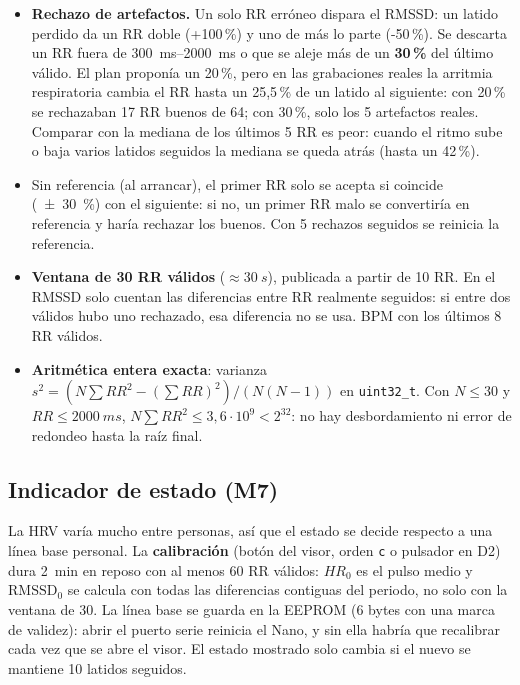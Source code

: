 \documentclass[11pt,a4paper]{article}
\begin{document}
\begin{itemize}[leftmargin=1.2em,itemsep=2pt,topsep=2pt]
  \item \textbf{Rechazo de artefactos.} Un solo RR erróneo dispara el RMSSD: un latido perdido
        da un RR doble (+100\,\%) y uno de más lo parte (-50\,\%). Se descarta un RR fuera de
        \qtyrange{300}{2000}{ms} o que se aleje más de un \textbf{30\,\%} del último válido.
        El plan proponía un 20\,\%, pero en las grabaciones reales la arritmia respiratoria
        cambia el RR hasta un 25,5\,\% de un latido al siguiente: con 20\,\% se rechazaban 17
        RR buenos de 64; con 30\,\%, solo los 5 artefactos reales. Comparar con la mediana de
        los últimos 5 RR es peor: cuando el ritmo sube o baja varios latidos seguidos la
        mediana se queda atrás (hasta un 42\,\%).
  \item Sin referencia (al arrancar), el primer RR solo se acepta si coincide (\qty{\pm 30}{\percent})
        con el siguiente: si no, un primer RR malo se convertiría en referencia y haría
        rechazar los buenos. Con 5 rechazos seguidos se reinicia la referencia.
  \item \textbf{Ventana de 30 RR válidos} ($\approx\qty{30}{s}$), publicada a partir de 10 RR.
        En el RMSSD solo cuentan las diferencias entre RR realmente seguidos: si entre dos
        válidos hubo uno rechazado, esa diferencia no se usa. BPM con los últimos 8 RR
        válidos.
  \item \textbf{Aritmética entera exacta}: varianza
        $s^2 = \left(N\sum RR^2 - (\sum RR)^2\right)/\left(N(N-1)\right)$ en
        \texttt{uint32\_t}. Con $N \le 30$ y $RR \le \qty{2000}{ms}$,
        $N\sum RR^2 \le 3{,}6\cdot 10^9 < 2^{32}$: no hay desbordamiento ni error de redondeo
        hasta la raíz final.
\end{itemize}

\subsection{Indicador de estado (M7)}

La HRV varía mucho entre personas, así que el estado se decide respecto a una línea base
personal. La \textbf{calibración} (botón del visor, orden \texttt{c} o pulsador en D2) dura
\qty{2}{min} en reposo con al menos 60 RR válidos: $HR_0$ es el pulso medio y
$\mathrm{RMSSD}_0$ se calcula con todas las diferencias contiguas del periodo, no solo con la
ventana de 30. La línea base se guarda en la EEPROM (6 bytes con una marca de validez): abrir
el puerto serie reinicia el Nano, y sin ella habría que recalibrar cada vez que se abre el
visor. El estado mostrado solo cambia si el nuevo se mantiene 10 latidos seguidos.
\end{document}
